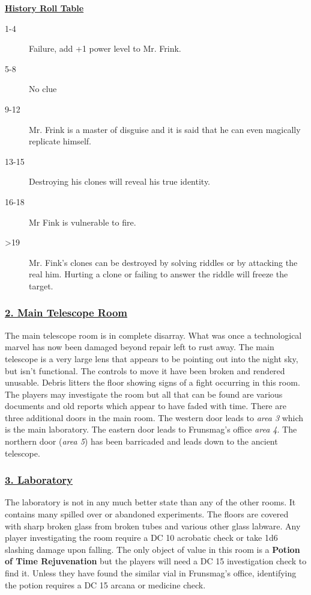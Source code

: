 \documentclass{article}
\begin{document}
\begin{multicols*}{2}
	\underline{\textbf{History Roll Table}}
	\begin{description}
		\item[1-4] Failure, add +1 power level to Mr. Frink.
		\item[5-8] No clue
		\item[9-12] Mr. Frink is a master of disguise and it is said that he can even magically replicate himself.
		\item[13-15] Destroying his clones will reveal his true identity.
		\item[16-18] Mr Fink is vulnerable to fire.
		\item[>19] Mr. Fink's clones can be destroyed by solving riddles or by attacking the real him. Hurting a clone or failing to answer the riddle will freeze the target. 
	\end{description}
	

	\subsubsection*{\underline{2. Main Telescope Room}}
	The main telescope room is in complete disarray. What was once a technological marvel has now been damaged beyond repair left to rust away. The main telescope is a very large lens that appears to be pointing out into the night sky, but isn't functional. The controls to move it have been broken and rendered unusable. Debris litters the floor showing signs of a fight occurring in this room. The players may investigate the room but all that can be found are various documents and old reports which appear to have faded with time. There are three additional doors in the main room. The western door leads to \emph{area 3} which is the main laboratory. The eastern door leads to Frunsmag's office \emph{area 4}. The northern door (\emph{area 5}) has been barricaded and leads down to the ancient telescope.
	
	\subsubsection*{\underline{3. Laboratory}}
	The laboratory is not in any much better state than any of the other rooms. It contains many spilled over or abandoned experiments. The floors are covered with sharp broken glass from broken tubes and various other glass labware. Any player investigating the room require a DC 10 acrobatic check or take 1d6 slashing damage upon falling. The only object of value in this room is a \textbf{Potion of Time Rejuvenation} but the players will need a DC 15 investigation check to find it. Unless they have found the similar vial in Frunsmag's office, identifying the potion requires a DC 15 arcana or medicine check. 
	

\end{multicols*}
\end{document}
